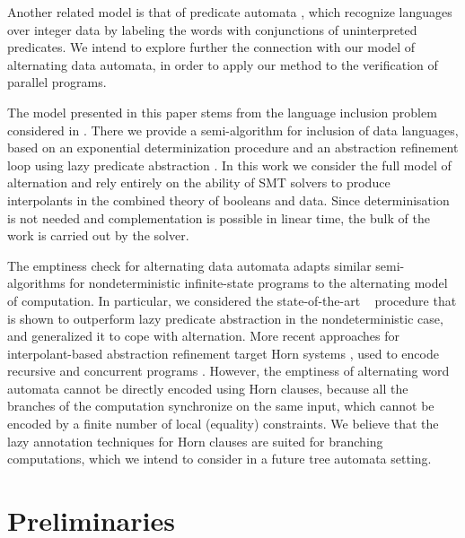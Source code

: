 \documentclass[10pt]{llncs}
\begin{document}

Another related model is that of predicate automata \cite{Farzan15},
which recognize languages over integer data by labeling the words with
conjunctions of uninterpreted predicates. We intend to explore further
the connection with our model of alternating data automata, in order
to apply our method to the verification of parallel programs.

The model presented in this paper stems from the language inclusion
problem considered in \cite{Tacas16}. There we provide a
semi-algorithm for inclusion of data languages, based on an
exponential determinization procedure and an abstraction refinement
loop using lazy predicate abstraction \cite{HJMS02}. In this work we
consider the full model of alternation and rely entirely on the
ability of SMT solvers to produce interpolants in the combined theory
of booleans and data. Since determinisation is not needed and
complementation is possible in linear time, the bulk of the work is
carried out by the solver. 

The emptiness check for alternating data automata adapts similar
semi-algorithms for nondeterministic infinite-state programs to the
alternating model of computation. In particular, we considered the
state-of-the-art \impact~ procedure \cite{mcmillan06} that is shown to
outperform lazy predicate abstraction \cite{HJMS02} in the
nondeterministic case, and generalized it to cope with
alternation. More recent approaches for interpolant-based abstraction
refinement target Horn systems \cite{McMillan14,Hoder12}, used to
encode recursive and concurrent programs
\cite{Grebenshchikov12}. However, the emptiness of alternating word
automata cannot be directly encoded using Horn clauses, because all
the branches of the computation synchronize on the same input, which
cannot be encoded by a finite number of local (equality)
constraints. We believe that the lazy annotation techniques for Horn
clauses are suited for branching computations, which we intend to
consider in a future tree automata setting.

\section{Preliminaries}
\end{document}
